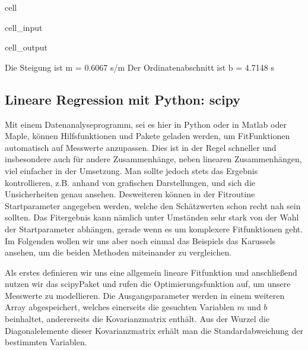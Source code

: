 \documentclass[letterpaper,10pt,english]{jupyterBook}
\begin{document}
\begin{sphinxuseclass}{cell}
\begin{sphinxVerbatimInput}
\begin{sphinxuseclass}{cell_input}
\end{sphinxuseclass}\end{sphinxVerbatimInput}
\begin{sphinxVerbatimOutput}

\begin{sphinxuseclass}{cell_output}
\begin{sphinxVerbatim}[commandchars=\\\{\}]
Die Steigung ist 		 m = 0.6067 s/m
Der Ordinatenabschnitt ist 	 b = 4.7148 s
\end{sphinxVerbatim}

\noindent{}

\end{sphinxuseclass}\end{sphinxVerbatimOutput}

\end{sphinxuseclass}

\subsection{Lineare Regression mit Python: scipy }
\label{\detokenize{content/T_LinReg:lineare-regression-mit-python-scipy-a-id-subsec-scipy-linreg-a}}
\sphinxAtStartPar
Mit einem Datenanalyseprogramm, sei es hier in Python oder in Matlab oder Maple, können Hilfsfunktionen und Pakete geladen werden, um Fit\sphinxhyphen{}Funktionen automatisch auf Messwerte anzupassen. Dies ist in der Regel schneller und insbesondere auch für andere Zusammenhänge, neben linearen Zusammenhängen, viel einfacher in der Umsetzung. Man sollte jedoch stets das Ergebnis kontrollieren, z.B. anhand von grafischen Darstellungen, und sich die Unsicherheiten genau ansehen. Desweiteren können in der Fitroutine Startparameter angegeben werden, welche den Schätzwerten schon recht nah sein sollten. Das Fitergebnis kann nämlich unter Umständen sehr stark von der Wahl der Startparameter abhängen, gerade wenn es um komplexere Fitfunktionen geht. Im Folgenden wollen wir uns aber noch einmal das Beispiels das Karussels ansehen, um die beiden Methoden miteinander zu vergleichen.

\sphinxAtStartPar
Als erstes definieren wir uns eine allgemein lineare Fitfunktion und anschließend nutzen wir das scipy\sphinxhyphen{}Paket und rufen die Optimierungsfunktion auf, um unsere Messwerte zu modellieren. Die Ausgangsparameter werden in einem weiteren Array abgespeichert, welches einerseits die gesuchten Variablen \(m\) und \(b\) beinhaltet, andererseits die Kovarianzmatrix enthält. Aus der Wurzel die Diagonalelemente dieser Kovarianzmatrix erhält man die Standardabweichung der bestimmten Variablen.
\end{document}
